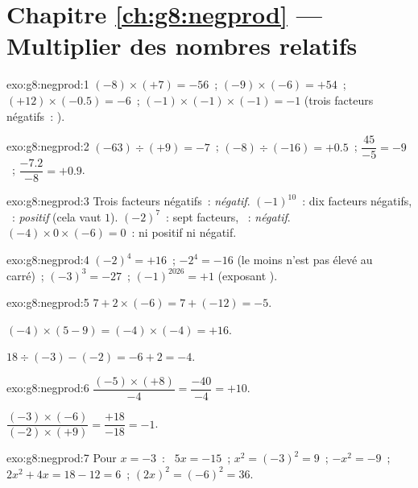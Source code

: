 \section*{Chapitre \ref{ch:g8:negprod} --- Multiplier des nombres relatifs}

\begin{solution}{exo:g8:negprod:1}
$(-8) \times (+7) = -56$~; \quad
$(-9) \times (-6) = +54$~; \quad
$(+12) \times (-0.5) = -6$~; \quad
$(-1) \times (-1) \times (-1) = -1$ (trois facteurs négatifs~: ).
\end{solution}

\begin{solution}{exo:g8:negprod:2}
$(-63) \div (+9) = -7$~; \quad
$(-8) \div (-16) = +0.5$~; \quad
$\dfrac{45}{-5} = -9$~; \quad
$\dfrac{-7.2}{-8} = +0.9$.
\end{solution}

\begin{solution}{exo:g8:negprod:3}
Trois facteurs négatifs~: \emph{négatif}. \quad
$(-1)^{10}$~: dix facteurs négatifs, ~: \emph{positif} (cela
vaut $1$). \quad
$(-2)^7$~: sept facteurs, ~: \emph{négatif}. \quad
$(-4) \times 0 \times (-6) = 0$~: ni positif ni négatif.
\end{solution}

\begin{solution}{exo:g8:negprod:4}
$(-2)^4 = +16$~; \quad $-2^4 = -16$ (le moins n'est pas élevé au
carré)~; \quad
$(-3)^3 = -27$~; \quad $(-1)^{2026} = +1$ (exposant ).
\end{solution}

\begin{solution}{exo:g8:negprod:5}
$7 + 2 \times (-6) = 7 + (-12) = -5$.

$(-4) \times (5 - 9) = (-4) \times (-4) = +16$.

$18 \div (-3) - (-2) = -6 + 2 = -4$.
\end{solution}

\begin{solution}{exo:g8:negprod:6}
$\dfrac{(-5) \times (+8)}{-4} = \dfrac{-40}{-4} = +10$.

$\dfrac{(-3) \times (-6)}{(-2) \times (+9)} = \dfrac{+18}{-18} = -1$.
\end{solution}

\begin{solution}{exo:g8:negprod:7}
Pour $x = -3$~: \ $5x = -15$~; \quad $x^2 = (-3)^2 = 9$~; \quad
$-x^2 = -9$~; \quad $2x^2 + 4x = 18 - 12 = 6$~; \quad
$(2x)^2 = (-6)^2 = 36$.
\end{solution}

